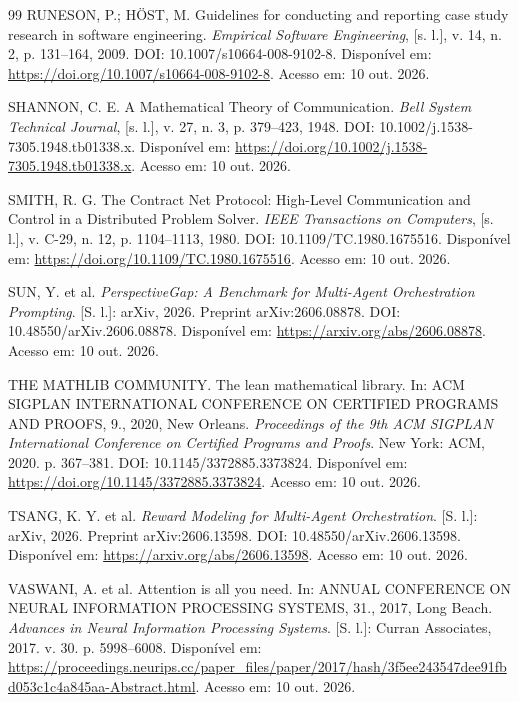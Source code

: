\documentclass[12pt,openany,oneside,a4paper,brazil,chapter=TITLE]{abntex2}
\begin{document}
\begin{SingleSpacing}
\begin{thebibliography}{99}
 RUNESON, P.; HÖST, M. Guidelines for conducting and reporting case study research in software engineering. \textit{Empirical Software Engineering}, [s. l.], v. 14, n. 2, p. 131--164, 2009. DOI: 10.1007/s10664-008-9102-8. Disponível em: \url{https://doi.org/10.1007/s10664-008-9102-8}. Acesso em: 10 out. 2026.

 SHANNON, C. E. A Mathematical Theory of Communication. \textit{Bell System Technical Journal}, [s. l.], v. 27, n. 3, p. 379--423, 1948. DOI: 10.1002/j.1538-7305.1948.tb01338.x. Disponível em: \url{https://doi.org/10.1002/j.1538-7305.1948.tb01338.x}. Acesso em: 10 out. 2026.

 SMITH, R. G. The Contract Net Protocol: High-Level Communication and Control in a Distributed Problem Solver. \textit{IEEE Transactions on Computers}, [s. l.], v. C-29, n. 12, p. 1104--1113, 1980. DOI: 10.1109/TC.1980.1675516. Disponível em: \url{https://doi.org/10.1109/TC.1980.1675516}. Acesso em: 10 out. 2026.

 SUN, Y. et al. \textit{PerspectiveGap: A Benchmark for Multi-Agent Orchestration Prompting}. [S. l.]: arXiv, 2026. Preprint arXiv:2606.08878. DOI: 10.48550/arXiv.2606.08878. Disponível em: \url{https://arxiv.org/abs/2606.08878}. Acesso em: 10 out. 2026.

 THE MATHLIB COMMUNITY. The lean mathematical library. In: ACM SIGPLAN INTERNATIONAL CONFERENCE ON CERTIFIED PROGRAMS AND PROOFS, 9., 2020, New Orleans. \textit{Proceedings of the 9th ACM SIGPLAN International Conference on Certified Programs and Proofs}. New York: ACM, 2020. p. 367--381. DOI: 10.1145/3372885.3373824. Disponível em: \url{https://doi.org/10.1145/3372885.3373824}. Acesso em: 10 out. 2026.

 TSANG, K. Y. et al. \textit{Reward Modeling for Multi-Agent Orchestration}. [S. l.]: arXiv, 2026. Preprint arXiv:2606.13598. DOI: 10.48550/arXiv.2606.13598. Disponível em: \url{https://arxiv.org/abs/2606.13598}. Acesso em: 10 out. 2026.

 VASWANI, A. et al. Attention is all you need. In: ANNUAL CONFERENCE ON NEURAL INFORMATION PROCESSING SYSTEMS, 31., 2017, Long Beach. \textit{Advances in Neural Information Processing Systems}. [S. l.]: Curran Associates, 2017. v. 30. p. 5998--6008. Disponível em: \url{https://proceedings.neurips.cc/paper_files/paper/2017/hash/3f5ee243547dee91fbd053c1c4a845aa-Abstract.html}. Acesso em: 10 out. 2026.


\end{thebibliography}
\end{SingleSpacing}
\end{document}
